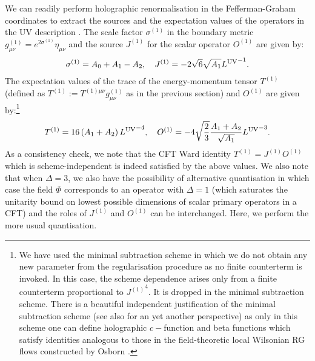 \documentclass[prd,reprint,a4paper,showpacs,superscriptaddress,11pt,onecolumn,nofootinbib]{revtex4-1}
\renewcommand{\(}{\left(}
\renewcommand{\)}{\right)}
\newcommand{\6}{\partial}
\begin{document}
We can readily perform holographic renormalisation in the Fefferman-Graham coordinates to extract the sources and the expectation values of the operators in the UV description \cite{Henningson:1998ey,Balasubramanian:1999re,deBoer:1999tgo,deHaro:2000vlm,Skenderis:2002wp}. The scale factor $\sigma^{(1)}$ in the boundary metric $g^{(1)}_{\mu\nu}= e^{2\sigma^{(1)}}\eta_{\mu\nu}$ and the source $J^{(1)}$ for the scalar operator $O^{(1)}$ are given by:
\begin{eqnarray}\label{sourceUV}
\sigma^{(1)} = A_0 + A_1 - A_2, \quad J^{(1)} = -2 \sqrt{6} \sqrt{A_1}{L^{\rm UV}}^{-1}.
\end{eqnarray}
The expectation values of the trace of the energy-momentum tensor $T^{(1)}$ (defined as $T^{(1)} := T^{(1)\mu\nu}g^{(1)}_{\mu\nu}$ as in the previous section) and $O^{(1)}$ are given by:\footnote{We have used the minimal subtraction scheme in which we do not obtain any new parameter from the regularisation procedure as no finite counterterm is invoked. In this case, the scheme dependence arises only from a finite counterterm proportional to ${J^{(1)}}^4$. It is dropped in the minimal subtraction scheme. There is a beautiful independent justification of the minimal subtraction scheme \cite{Anselmi:2000fu,Erdmenger:2001ja} (see also \cite{Behr:2015aat} for an yet another perspective) as only in this scheme one can define holographic $c-$function and beta functions which satisfy identities analogous to those in the field-theoretic local Wilsonian RG flows constructed by Osborn \cite{Osborn:1991gm}.}
\begin{eqnarray}\label{vevUV}
T^{(1)} = 16 \left(A_1 +A_2\right) {L^{\rm UV}}^{-4}, \quad O^{(1)} = - 4 \sqrt{\dfrac{2}{3}} \dfrac{A_1 + A_2}{\sqrt{A_1}}{L^{\rm UV}}^{-3}.
\end{eqnarray}
As a consistency check, we note that the CFT Ward identity $T^{(1)} = J^{(1)} O^{(1)}$ which is scheme-independent is indeed satisfied by the above values. We also note that when $\Delta = 3$, we also have the possibility of alternative quantisation in which case the field $\Phi$ corresponds to an operator with $\Delta = 1$ (which saturates the unitarity bound on lowest possible dimensions of scalar primary operators in a CFT) and the roles of $J^{(1)}$ and $O^{(1)}$ can be interchanged. Here, we perform the more usual quantisation.
\end{document}
